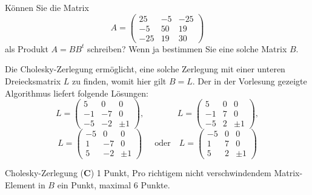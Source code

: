 Können Sie die Matrix 
\[
A
=
\begin{pmatrix}
 25& -5& -25\\
 -5& 50&  19\\
-25& 19&  30
\end{pmatrix}
\]
als Produkt $A=BB^t$ schreiben?
Wenn ja bestimmen Sie eine solche Matrix $B$.

\begin{loesung}
Die Cholesky-Zerlegung ermöglicht, eine solche Zerlegung 
mit einer unteren Dreiecksmatrix $L$ zu finden, womit hier gilt $B = L$. 
Der in der Vorlesung gezeigte Algorithmus liefert folgende Lösungen:
\[
L=\begin{pmatrix}
   5&  0&  0\\
  -1& -7&  0\\
  -5& -2& \pm 1
\end{pmatrix},
\quad\phantom{\text{oder}}\quad
L=\begin{pmatrix}
   5&  0&  0\\
  -1&  7&  0\\
  -5&  2& \pm 1
\end{pmatrix},
\]
\[
L=\begin{pmatrix}
  -5&  0&  0\\
   1& -7&  0\\
   5& -2& \pm 1
\end{pmatrix}\phantom{,}
\quad\text{oder}\quad
L=\begin{pmatrix}
  -5&  0&  0\\
   1&  7&  0\\
   5&  2& \pm 1
\end{pmatrix}
\]

\end{loesung}

\begin{bewertung}
Cholesky-Zerlegung ({\bf C}) 1 Punkt, Pro richtigem nicht verschwindendem Matrix-Element in $B$ ein
Punkt, maximal 6 Punkte.
\end{bewertung}
